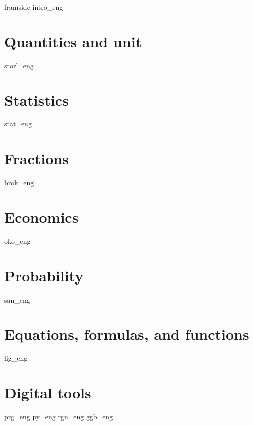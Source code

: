 



\usepackage[angle=0, color={[rgb]{1,0,0}}, scale = 0.075, vpos = 20pt]{draftwatermark}





{framside}
{intro_eng}
\newpage
\tableofcontents

\chapter{Quantities and unit \label{Storlogenh}}
\newpage

{storl_eng}

\chapter{Statistics \label{Statistikk}}
\newpage
{stat_eng}

\chapter{Fractions \label{BrokAM}}
\newpage
{brok_eng}
\newpage

\chapter{Economics \label{Okonomi}}
\newpage
{oko_eng}

\chapter{Probability \label{Sannsyn}} 
\newpage
{san_eng}

\chapter{Equations, formulas, and functions \label{LigningerAM}}
\newpage
{lig_eng}

\chapter{Digital tools \label{Dig}}
{prg_eng}
{py_eng}
{rgn_eng}	
{ggb_eng}	

